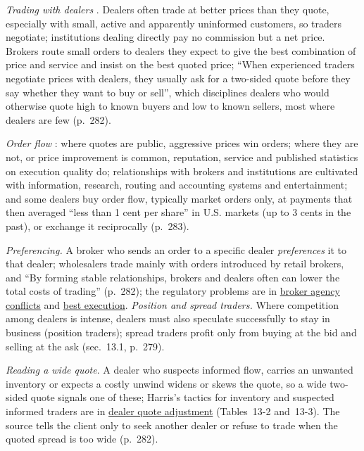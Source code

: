 \begin{qfdefinition}
 \emph{Trading with dealers} \citep[same chap., sec.~13.3, pp.~281--282]{alpha-harris}. Dealers often trade at better prices than they quote, especially with small, active and apparently uninformed customers, so traders negotiate; institutions dealing directly pay no commission but a net price. Brokers route small orders to dealers they expect to give the best combination of price and service and insist on the best quoted price; ``When experienced traders negotiate prices with dealers, they usually ask for a two-sided quote before they say whether they want to buy or sell'', which disciplines dealers who would otherwise quote high to known buyers and low to known sellers, most where dealers are few (p.~282).

\emph{Order flow} \citep[same chap., sec.~13.4, pp.~282--283]{alpha-harris}: where quotes are public, aggressive prices win orders; where they are not, or price improvement is common, reputation, service and published statistics on execution quality do; relationships with brokers and institutions are cultivated with information, research, routing and accounting systems and entertainment; and some dealers buy order flow, typically market orders only, at payments that then averaged ``less than 1 cent per share'' in U.S. markets (up to 3 cents in the past), or exchange it reciprocally (p.~283).

 \emph{Preferencing.} A broker who sends an order to a specific dealer \emph{preferences} it to that dealer; wholesalers trade mainly with orders introduced by retail brokers, and ``By forming stable relationships, brokers and dealers often can lower the total costs of trading'' (p.~282); the regulatory problems are in \hyperref[def:broker-agency-conflicts]{broker agency conflicts} and \hyperref[def:best-execution]{best execution}. \emph{Position and spread traders.} Where competition among dealers is intense, dealers must also speculate successfully to stay in business (position traders); spread traders profit only from buying at the bid and selling at the ask (sec.~13.1, p.~279).

\emph{Reading a wide quote}. A dealer who suspects informed flow, carries an unwanted inventory or expects a costly unwind widens or skews the quote, so a wide two-sided quote signals one of these; Harris's tactics for inventory and suspected informed traders are in \hyperref[meth:dealer-quote-adjustment]{dealer quote adjustment} (Tables~13-2 and~13-3). The source tells the client only to seek another dealer or refuse to trade when the quoted spread is too wide (p.~282).


\end{qfdefinition}
